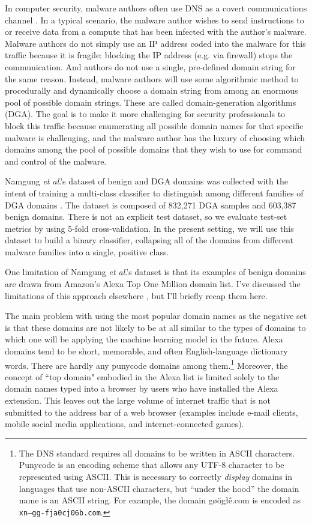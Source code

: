 \documentclass[conference]{IEEEtran}
\begin{document}
    In computer security, malware authors often use DNS as a covert communications channel \cite{kuo-2023}. In a typical scenario, the malware author wishes to send instructions to or receive data from a compute that has been infected with the author's malware. Malware authors do not simply use an IP address coded into the malware for this traffic because it is fragile: blocking the IP address (e.g. via firewall) stops the communication. And authors do not use a single, pre-defined domain string for the same reason. Instead, malware authors will use some algorithmic method to procedurally and dynamically choose a domain string from among an enormous pool of possible domain strings. These are called domain-generation algorithms (DGA). The goal is to make it more challenging for security professionals to block this traffic because enumerating all possible domain names for that specific malware is challenging, and the malware author has the luxury of choosing which domains among the pool of possible domains that they wish to use for command and control of the malware.

    Namgung \textit{et al}.'s dataset of benign and DGA domains was collected with the intent of training a multi-class classifier to distinguish among different families of DGA domains \cite{namgung-2021}. The dataset is composed of 832,271 DGA samples and 603,387 benign domains. There is not an explicit test dataset, so we evaluate test-set metrics by using 5-fold cross-validation. In the present setting, we will use this dataset to build a binary classifier, collapsing all of the domains from different malware families into a single, positive class. 

    One limitation of  Namgung \textit{et al}.'s dataset is that its examples of benign domains are drawn from Amazon's Alexa Top One Million domain list. I've discussed the limitations of this approach elsewhere \cite{elkind-2023}, but I'll briefly recap them here.

    The main problem with using the most popular domain names as the negative set is that these domains are not likely to be at all similar to the types of domains to which one will be applying the machine learning model in the future. Alexa domains tend to be short, memorable, and often English-language dictionary words. There are hardly any punycode domains among them.\footnote{The DNS standard requires all domains to be written in ASCII characters. Punycode is an encoding scheme that allows any UTF-8 character to be represented using ASCII. This is necessary to correctly \textit{display} domains in languages that use non-ASCII characters, but ``under the hood'' the domain name is an ASCII string. For example, the domain g{\o}{\"o}g{\l}{\^e}.com is encoded as \texttt{xn--gg-fja0cj06b.com}.} Moreover, the concept of ``top domain" embodied in the Alexa list is limited solely to the domain names typed into a browser by users who have installed the Alexa extension. This leaves out the large volume of internet traffic that is not submitted to the address bar of a web browser (examples include e-mail clients, mobile social media applications, and internet-connected games).
\end{document}
